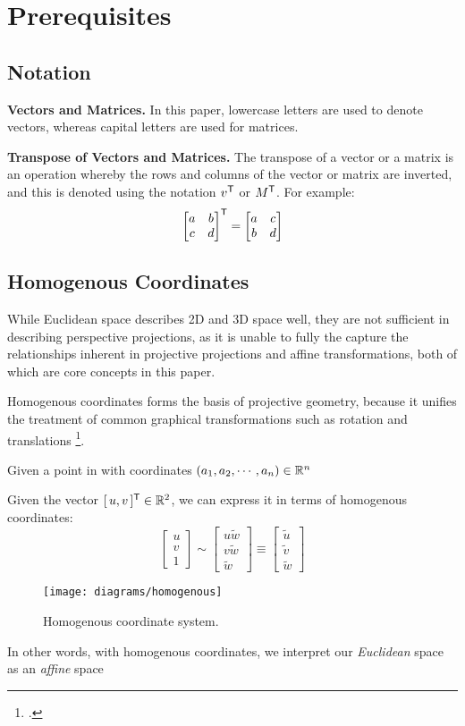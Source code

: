 \section{Prerequisites}

\subsection{Notation}
\noindent\textbf{Vectors and Matrices.} In this paper, lowercase letters are used to denote vectors, whereas capital letters are used for matrices. 

\noindent\textbf{Transpose of Vectors and Matrices.} The transpose of a vector or a matrix is an operation whereby the rows and columns of the vector or matrix are inverted, and this is denoted using the notation $v^{\mathsf{T}}$ or $M^{\mathsf{T}}$. For example:
\[
    \begin{bmatrix}
        a & b \\
        c & d
    \end{bmatrix}^{\mathsf{T}}
    =
    \begin{bmatrix}
        a & c \\
        b & d
    \end{bmatrix}
\]

\subsection{Homogenous Coordinates} \label{sec:homogenous}

While Euclidean space describes 2D and 3D space well, they are not sufficient in describing perspective projections, as it is unable to fully the capture the relationships inherent in projective projections and affine transformations, both of which are core concepts in this paper. 

Homogenous coordinates forms the basis of projective geometry, because it unifies the treatment of common graphical transformations such as rotation and translations \footcite[][1]{bloomenthalHomogeneousCoordinates1994}. 

Given a point in with coordinates $(a_1, a_2, \cdots, a_n) \in \mathbb{R}^n$ 



Given the vector $[\,u, v\,]^{\mathsf{T}} \in \mathbb{R}^2$, we can express it in terms of homogenous coordinates: 
\begin{equation}
    \begin{bmatrix}
        u \\ v \\ 1
    \end{bmatrix}
    \sim
    \begin{bmatrix}
        u\widetilde{w} \\ v\widetilde{w} \\ \widetilde{w}
    \end{bmatrix}
    \equiv
    \begin{bmatrix}
        \widetilde{u} \\ \widetilde{v} \\ \widetilde{w}
    \end{bmatrix}
\end{equation}

\begin{figure}[H]
    \centering
    \texttt{[image: diagrams/homogenous]}
    \caption{Homogenous coordinate system.}
\end{figure}

In other words, with homogenous coordinates, we interpret our \emph{Euclidean} space as an \emph{affine} space

